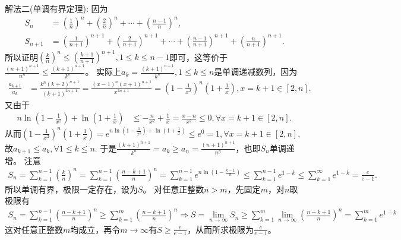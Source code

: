 \documentclass[../../main.tex]{subfiles}%
\begin{document}
\begin{solution}
{\color{blue}解法二(单调有界定理):}
因为
\begin{align*}
S_n&=\left(\frac{1}{n}\right)^n+\left(\frac{2}{n}\right)^n+\cdots+\left(\frac{n - 1}{n}\right)^n,\\
S_{n + 1}&=\left(\frac{1}{n + 1}\right)^{n + 1}+\left(\frac{2}{n + 1}\right)^{n + 1}+\cdots+\left(\frac{n - 1}{n + 1}\right)^{n + 1}+\left(\frac{n}{n + 1}\right)^{n + 1}.
\end{align*}
所以证明\(\left(\frac{k}{n}\right)^n\leqslant \left(\frac{k + 1}{n + 1}\right)^{n + 1},1\leqslant  k\leqslant  n - 1\)即可，这等价于\(\frac{(n + 1)^{n + 1}}{n^n}\leqslant \frac{(k + 1)^{n + 1}}{k^n}\)。
实际上\(a_k = \frac{(k + 1)^{n + 1}}{k^n},1\leqslant  k\leqslant  n\)是单调递减数列，因为
\begin{align*}
\frac{a_{k + 1}}{a_k}&=\frac{k^n(k + 2)^{n + 1}}{(k + 1)^{2n + 1}}=\frac{(x - 1)^n(x + 1)^{n + 1}}{x^{2n + 1}}=\left(1-\frac{1}{x^2}\right)^n\left(1+\frac{1}{x}\right),x = k + 1\in[2,n].
\end{align*}
又由于
\begin{align*}
n\ln\left(1-\frac{1}{x^2}\right)+\ln\left(1+\frac{1}{x}\right)&\leqslant -\frac{n}{x^2}+\frac{1}{x}=\frac{x - n}{x^2}\leqslant 0,\forall x = k + 1\in[2,n].
\end{align*}
从而$\left( 1-\frac{1}{x^2} \right) ^n\left( 1+\frac{1}{x} \right) =e^{n\ln \left( 1-\frac{1}{x^2} \right) +\ln \left( 1+\frac{1}{x} \right)}\leqslant e^0=1,\forall x = k + 1\in[2,n]$,故$a_{k + 1}\leqslant  a_k,\forall 1\leqslant  k\leqslant  n$.
于是\(\frac{(k + 1)^{n + 1}}{k^n}=a_k\geqslant  a_n=\frac{(n + 1)^{n + 1}}{n^n}\)，也即\(S_n\)单调递增。
注意
\begin{align*}
S_n=\sum\limits_{k=1}^{n-1}{\left( \frac{k}{n} \right) ^n}=\sum\limits_{k=1}^{n-1}{\left( \frac{n-k+1}{n} \right) ^n}=\sum\limits_{k=1}^{n-1}{e^{n\ln \left( 1-\frac{k-1}{n} \right)}}\leqslant \sum\limits_{k=1}^{n-1}{e^{1-k}}\leqslant \sum\limits_{k=1}^{\infty}{e^{1-k}}=\frac{e}{e-1}.
\end{align*}
所以单调有界，极限一定存在，设为\(S\)。
对任意正整数\(n>m\)，先固定\(m\)，对\(n\)取极限有
\begin{align*}
S_n=\sum\limits_{k=1}^{n-1}{\left( \frac{n-k+1}{n} \right) ^n}\geqslant \sum\limits_{k=1}^m{\left( \frac{n-k+1}{n} \right) ^n\Rightarrow S}=\lim_{n\rightarrow \infty} S_n\geqslant \sum\limits_{k=1}^m{\lim_{n\rightarrow \infty} \left( \frac{n-k+1}{n} \right) ^n}=\sum\limits_{k=1}^m{e^{1-k}}
\end{align*}这对任意正整数\(m\)均成立，再令\(m\rightarrow\infty\)有\(S\geqslant \frac{e}{e - 1}\)，从而所求极限为\(\frac{e}{e - 1}\)。

\end{solution}
\end{document}
